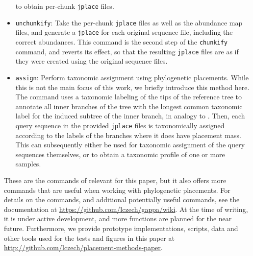 \begin{itemize}
          to obtain per-chunk \texttt{jplace} files.
    \item \texttt{unchunkify}: Take the per-chunk \texttt{jplace} files as well as the abundance map files,
          and generate a \texttt{jplace} for each original sequence file, including the correct abundances.
          This command is the second step of the \texttt{chunkify} command, and reverts its effect,
          so that the resulting \texttt{jplace} files are as if they were created using the original sequence files.
    \item \texttt{assign}: Perform taxonomic assignment using phylogenetic placements.
          While this is not the main focus of this work, we briefly introduce this method here.
          The command uses a taxonomic labeling of the tips of the reference tree
          to annotate all inner branches of the tree with the longest common taxonomic label
          for the induced subtree of the inner branch, in analogy to  \citep{Kozlov2016}.
          Then, each query sequence in the provided \texttt{jplace} files
          is taxonomically assigned according to the labels of the branches where it does have placement mass.
          This can subsequently either be used for taxonomic assignment of the query sequences themselves,
          or to obtain a taxonomic profile of one or more samples.
\end{itemize}

These are the commands of  relevant for this paper,
but it also offers more commands that are useful when working with phylogenetic placements.
For details on the commands, and additional potentially useful commands,
see the  documentation at \url{https://github.com/lczech/gappa/wiki}.
At the time of writing, it is under active development, and more functions are planned for the near future.
Furthermore, we provide prototype implementations, scripts, data and other tools
used for the tests and figures in this paper at \url{http://github.com/lczech/placement-methods-paper}.
